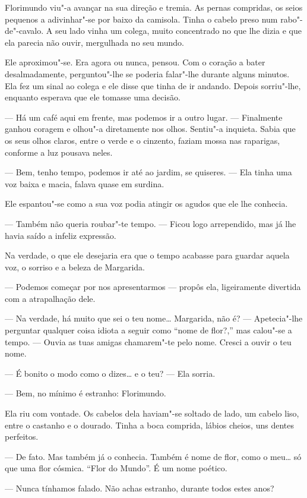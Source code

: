 Florimundo viu"-a avançar na sua direção e tremia. As pernas compridas,
os seios pequenos a adivinhar"-se por baixo da camisola. Tinha o cabelo
preso num rabo"-de"-cavalo. A seu lado vinha um colega, muito concentrado
no que lhe dizia e que ela parecia não ouvir, mergulhada no seu mundo.

Ele aproximou"-se. Era agora ou nunca, pensou. Com o coração a bater
desalmadamente, perguntou"-lhe se poderia falar"-lhe durante alguns
minutos. Ela fez um sinal ao colega e ele disse que tinha de ir andando.
Depois sorriu"-lhe, enquanto esperava que ele tomasse uma decisão.

--- Há um café aqui em frente, mas podemos ir a outro lugar. --- Finalmente
ganhou coragem e olhou"-a diretamente nos olhos. Sentiu"-a inquieta.
Sabia que os seus olhos claros, entre o verde e o cinzento, faziam mossa
nas raparigas, conforme a luz pousava neles.

--- Bem, tenho tempo, podemos ir até ao jardim, se quiseres. --- Ela tinha
uma voz baixa e macia, falava quase em surdina.

Ele espantou"-se como a sua voz podia atingir os agudos que ele lhe
conhecia.

--- Também não queria roubar"-te tempo. --- Ficou logo arrependido, mas já
lhe havia saído a infeliz expressão.

Na verdade, o que ele desejaria era que o tempo acabasse para guardar
aquela voz, o sorriso e a beleza de Margarida.

--- Podemos começar por nos apresentarmos --- propôs ela, ligeiramente
divertida com a atrapalhação dele.

--- Na verdade, há muito que sei o teu nome\ldots{} Margarida, não é? ---
Apetecia"-lhe perguntar qualquer coisa idiota a seguir como ``nome de
flor?,'' mas calou"-se a tempo. --- Ouvia as tuas amigas chamarem"-te pelo
nome. Cresci a ouvir o teu nome.

--- É bonito o modo como o dizes\ldots{} e o teu? --- Ela sorria.

--- Bem, no mínimo é estranho: Florimundo.

Ela riu com vontade. Os cabelos dela haviam"-se soltado de lado, um
cabelo liso, entre o castanho e o dourado. Tinha a boca comprida, lábios
cheios, uns dentes perfeitos.

--- De fato. Mas também já o conhecia. Também é nome de flor, como o
meu\ldots{} só que uma flor cósmica. ``Flor do Mundo''. É um nome poético.

--- Nunca tínhamos falado. Não achas estranho, durante todos estes anos?

